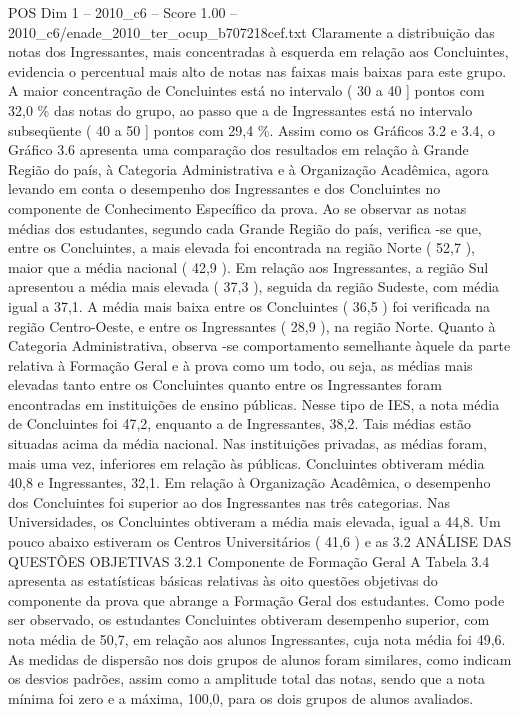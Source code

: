 \begin{textsample}{POS Dim 1 – 2010\_c6 – Score 1.00 – 2010\_c6/enade\_2010\_ter\_ocup\_b707218cef.txt}
Claramente a distribuição das notas dos Ingressantes, mais concentradas à esquerda em relação aos Concluintes, evidencia o percentual mais alto de notas nas faixas mais baixas para este grupo.
A maior concentração de Concluintes está no intervalo ( 30 a 40 ] pontos com 32,0 \% das notas do grupo, ao passo que a de Ingressantes está no intervalo subseqüente ( 40 a 50 ] pontos com 29,4 \%.
Assim como os Gráficos 3.2 e 3.4, o Gráfico 3.6 apresenta uma comparação dos resultados em relação à Grande Região do país, à Categoria Administrativa e à Organização Acadêmica, agora levando em conta o desempenho dos Ingressantes e dos Concluintes no componente de Conhecimento Específico da prova.
Ao se observar as notas médias dos estudantes, segundo cada Grande Região do país, verifica -se que, entre os Concluintes, a mais elevada foi encontrada na região Norte ( 52,7 ), maior que a média nacional ( 42,9 ).
Em relação aos Ingressantes, a região Sul apresentou a média mais elevada ( 37,3 ), seguida da região Sudeste, com média igual a 37,1.
A média mais baixa entre os Concluintes ( 36,5 ) foi verificada na região Centro-Oeste, e entre os Ingressantes ( 28,9 ), na região Norte.
Quanto à Categoria Administrativa, observa -se comportamento semelhante àquele da parte relativa à Formação Geral e à prova como um todo, ou seja, as médias mais elevadas tanto entre os Concluintes quanto entre os Ingressantes foram encontradas em instituições de ensino públicas.
Nesse tipo de IES, a nota média de Concluintes foi 47,2, enquanto a de Ingressantes, 38,2.
Tais médias estão situadas acima da média nacional.
Nas instituições privadas, as médias foram, mais uma vez, inferiores em relação às públicas.
Concluintes obtiveram média 40,8 e Ingressantes, 32,1.
Em relação à Organização Acadêmica, o desempenho dos Concluintes foi superior ao dos Ingressantes nas três categorias.
Nas Universidades, os Concluintes obtiveram a média mais elevada, igual a 44,8.
Um pouco abaixo estiveram os Centros Universitários ( 41,6 ) e as 3.2 ANÁLISE DAS QUESTÕES OBJETIVAS 3.2.1 Componente de Formação Geral A Tabela 3.4 apresenta as estatísticas básicas relativas às oito questões objetivas do componente da prova que abrange a Formação Geral dos estudantes.
Como pode ser observado, os estudantes Concluintes obtiveram desempenho superior, com nota média de 50,7, em relação aos alunos Ingressantes, cuja nota média foi 49,6.
As medidas de dispersão nos dois grupos de alunos foram similares, como indicam os desvios padrões, assim como a amplitude total das notas, sendo que a nota mínima foi zero e a máxima, 100,0, para os dois grupos de alunos avaliados.

\end{textsample}
